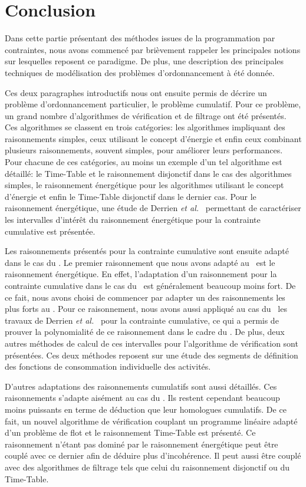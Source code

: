 \chapter*{Conclusion}

Dans cette partie présentant des méthodes issues de la programmation
par contraintes, nous avons commencé par brièvement rappeler les
principales notions sur lesquelles reposent ce paradigme. De plus, une
description des principales techniques de modélisation des problèmes
d'ordonnancement à été donnée. 

Ces deux paragraphes introductifs nous ont ensuite permis de décrire
un problème d'ordonnancement particulier, le problème cumulatif. Pour
ce problème, un grand nombre d'algorithmes de vérification et de
filtrage ont été présentés. Ces algorithmes se classent en trois
catégories: les algorithmes impliquant des raisonnements simples, ceux
utilisant le concept d'énergie et enfin ceux combinant plusieurs
raisonnements, souvent simples, pour améliorer leurs
performances. Pour chacune de ces catégories, au moins un exemple d'un
tel algorithme est détaillé: le Time-Table et le raisonnement
disjonctif dans le cas des algorithmes simples, le raisonnement
énergétique pour les algorithmes utilisant le concept d'énergie et
enfin le Time-Table disjonctif dans le dernier cas. Pour le
raisonnement énergétique, une étude de Derrien {\it et al.}~\cite{DP}
permettant de caractériser les intervalles d'intérêt du raisonnement
énergétique pour la contrainte cumulative est présentée.

Les raisonnements présentés pour la contrainte cumulative sont ensuite
adapté dans le cas du \CECSP. Le premier raisonnement que nous avons
adapté au \CECSP~est le raisonnement énergétique. En effet,
l'adaptation d'un raisonnement pour la contrainte cumulative dans le
cas du \CECSP~est généralement beaucoup moins fort. De ce fait, nous
avons choisi de commencer par adapter un des raisonnements les plus
forts au \CECSP. Pour ce raisonnement, nous avons aussi appliqué au
cas du \CECSP~les travaux de Derrien {\it et al.}~\cite{DP} pour la
contrainte cumulative, ce qui a permis de prouver la polynomialité de
ce raisonnement dans le cadre du \CECSP. De plus, deux autres
méthodes de calcul de ces intervalles pour l'algorithme de
vérification sont présentées. Ces deux méthodes reposent sur une étude
des segments de définition des fonctions de consommation individuelle
des activités.

D'autres adaptations des raisonnements cumulatifs sont aussi
détaillés. Ces raisonnements s'adapte aisément au cas du \CECSP. Ils
restent cependant beaucoup moins puissants en terme de déduction que
leur homologues cumulatifs. De ce fait, un nouvel algorithme de
vérification couplant un programme linéaire adapté d'un problème de
flot et le raisonnement Time-Table est présenté. Ce raisonnement
n'étant pas dominé par le raisonnement énergétique peut être couplé
avec ce dernier afin de déduire plus d'incohérence. Il peut aussi être
couplé avec des algorithmes de filtrage tels que celui du raisonnement
disjonctif ou du Time-Table. 

